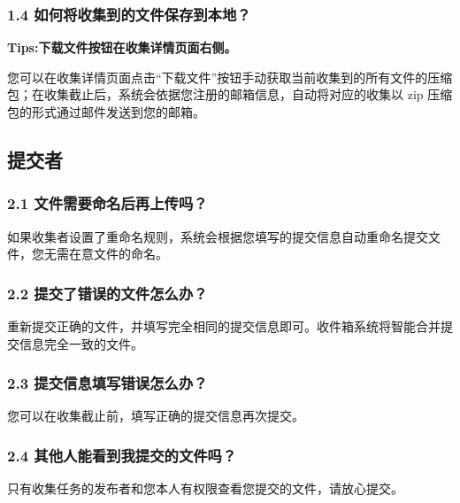\documentclass[lang=cn,11pt,a4paper]{elegantpaper}
\begin{document}
\subsubsection*{1.4 如何将收集到的文件保存到本地？}


{\bf Tips:下载文件按钮在收集详情页面右侧。}


您可以在收集详情页面点击“下载文件”按钮手动获取当前收集到的所有文件的压缩包；在收集截止后，系统会依据您注册的邮箱信息，自动将对应的收集以 zip 压缩包的形式通过邮件发送到您的邮箱。

\subsection{提交者}

\subsubsection*{2.1 文件需要命名后再上传吗？}
如果收集者设置了重命名规则，系统会根据您填写的提交信息自动重命名提交文件，您无需在意文件的命名。

\subsubsection*{2.2 提交了错误的文件怎么办？}

重新提交正确的文件，并填写完全相同的提交信息即可。收件箱系统将智能合并提交信息完全一致的文件。

\subsubsection*{2.3 提交信息填写错误怎么办？}

您可以在收集截止前，填写正确的提交信息再次提交。

\subsubsection*{2.4 其他人能看到我提交的文件吗？}

只有收集任务的发布者和您本人有权限查看您提交的文件，请放心提交。
\end{document}

